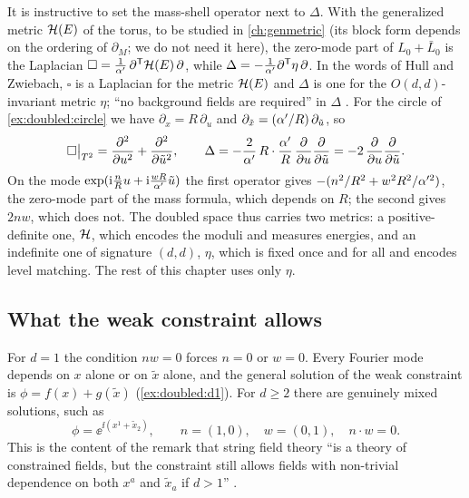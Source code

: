 It is instructive to set the mass-shell operator next to $\Delta$. With the generalized metric
$\mathcal{H}(E)$ of the torus, to be studied in \cref{ch:genmetric} (its block form depends on the
ordering of $\partial_M$; we do not need it here), the zero-mode part of
$L_0+\bar L_0$ is the Laplacian $\square=\frac1{\alpha'}\,\partial^{\mathsf T}\mathcal{H}(E)\,\partial$,
while $\Delta=-\frac1{\alpha'}\partial^{\mathsf T}\eta\,\partial$. In the words of Hull and
Zwiebach, $\square$ is a Laplacian for the metric $\mathcal{H}(E)$ and $\Delta$ is one for the
$O(d,d)$-invariant metric $\eta$; ``no background fields are required'' in $\Delta$
. For the circle of
\cref{ex:doubled:circle} we have $\partial_x=R\,\partial_u$ and
$\partial_{\tilde x}=(\alpha'/R)\,\partial_{\tilde u}$, so
\begin{equation}\label{eq:doubled:circleops}
\square\big|_{T^2}=\frac{\partial^2}{\partial u^2}+\frac{\partial^2}{\partial\tilde u^2},
\qquad
\Delta=-\frac2{\alpha'}\,R\cdot\frac{\alpha'}{R}\,\frac{\partial}{\partial u}\frac{\partial}{\partial
\tilde u}=-2\,\frac{\partial}{\partial u}\frac{\partial}{\partial\tilde u} .
\end{equation}
On the mode $\exp(\mathrm{i}\frac nRu+\mathrm{i}\frac{wR}{\alpha'}\tilde u)$ the first operator gives
$-(n^2/R^2+w^2R^2/\alpha'^2)$, the zero-mode part of the mass formula, which depends on $R$; the
second gives $2nw$, which does not. The doubled space thus carries two metrics: a
positive-definite one, $\mathcal{H}$, which encodes the moduli and measures energies, and an indefinite
one of signature $(d,d)$, $\eta$, which is fixed once and for all and encodes level matching.
The rest of this chapter uses only $\eta$.

\subsection{What the weak constraint allows}

For $d=1$ the condition $nw=0$ forces $n=0$ or $w=0$. Every Fourier mode depends on $x$ alone
or on $\tilde x$ alone, and the general solution of the weak constraint is
$\phi=f(x)+g(\tilde x)$ (\cref{ex:doubled:d1}). For $d\ge2$ there are genuinely mixed
solutions, such as
\begin{equation}\label{eq:doubled:mixedmode}
\phi=\ee^{\ii(x^1+\tilde x_2)},\qquad n=(1,0),\quad w=(0,1),\quad n\cdot w=0 .
\end{equation}
This is the content of the remark that string field theory ``is a theory of constrained fields,
but the constraint still allows fields with non-trivial dependence on both $x^a$ and
$\tilde x_a$ if $d>1$'' .

